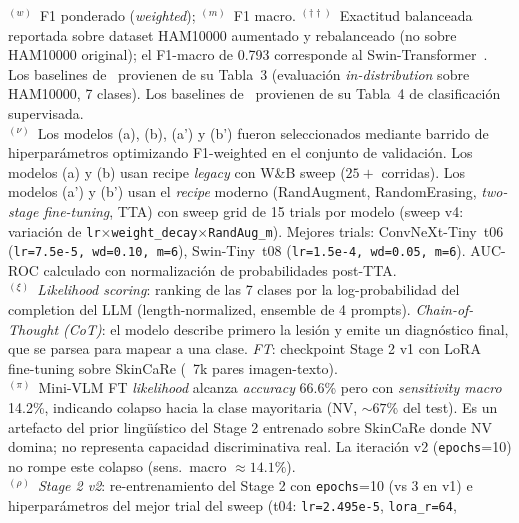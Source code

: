 \begin{table}[htbp]
{\begin{tabular}{@{}llccrrrrr@{}}
\bottomrule
\end{tabular}%
}
\vspace{4pt}
\begin{minipage}{\textwidth}
  \footnotesize
  $^{(w)}$~F1 ponderado (\textit{weighted}); $^{(m)}$~F1 macro.
  $^{(\dagger\dagger)}$~Exactitud balanceada reportada sobre dataset HAM10000
  aumentado y rebalanceado (no sobre HAM10000 original);
  el F1-macro de 0.793 corresponde al Swin-Transformer~\cite{SkinSavvy22025}.\\
  Los baselines de~\cite{SkinR12025} provienen de su Tabla~3
  (evaluación \textit{in-distribution} sobre HAM10000, 7 clases).
  Los baselines de~\cite{MMSkin2025} provienen de su Tabla~4 de clasificación supervisada.\\
  $^{(\nu)}$~Los modelos (a), (b), (a') y (b') fueron seleccionados mediante barrido de hiperparámetros
  optimizando F1-weighted en el conjunto de validación.
  Los modelos (a) y (b) usan recipe \textit{legacy} con W\&B sweep ($25{+}$ corridas).
  Los modelos (a') y (b') usan el \textit{recipe} moderno (RandAugment, RandomErasing,
  \textit{two-stage fine-tuning}, TTA) con sweep grid de 15 trials por modelo
  (sweep v4: variación de \texttt{lr}$\times$\texttt{weight\_decay}$\times$\texttt{RandAug\_m}).
  Mejores trials: ConvNeXt-Tiny~t06 (\texttt{lr=7.5e-5, wd=0.10, m=6}),
  Swin-Tiny~t08 (\texttt{lr=1.5e-4, wd=0.05, m=6}).
  AUC-ROC calculado con normalización de probabilidades post-TTA.\\[4pt]
  $^{(\xi)}$~\textit{Likelihood scoring}: ranking de las 7 clases por la log-probabilidad
  del completion del LLM (length-normalized, ensemble de 4 prompts).
  \textit{Chain-of-Thought (CoT)}: el modelo describe primero la lesión y emite
  un diagnóstico final, que se parsea para mapear a una clase.
  \textit{FT}: checkpoint Stage 2 v1 con LoRA fine-tuning sobre SkinCaRe (~7k pares imagen-texto).\\[4pt]
  $^{(\pi)}$~Mini-VLM FT \textit{likelihood} alcanza \textit{accuracy} 66.6\% pero con
  \textit{sensitivity macro} 14.2\%, indicando colapso hacia la clase mayoritaria (NV, ${\sim}67\%$
  del test). Es un artefacto del prior lingüístico del Stage 2 entrenado sobre SkinCaRe
  donde NV domina; no representa capacidad discriminativa real.
  La iteración v2 (\texttt{epochs}=10) no rompe este colapso (sens.\ macro $\approx 14.1\%$).\\[4pt]
  $^{(\rho)}$~\textit{Stage 2 v2}: re-entrenamiento del Stage 2 con \texttt{epochs}=10 (vs 3 en v1)
  e hiperparámetros del mejor trial del sweep (t04: \texttt{lr=2.495e-5}, \texttt{lora\_r=64},

\end{minipage}
\end{table}
